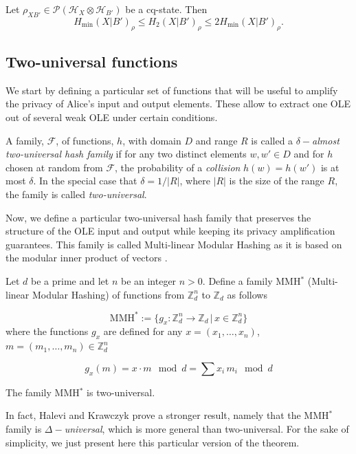 \begin{lemma}
Let $\rho_{X B'}\in\mathcal{P}(\mathcal{H}_X \otimes \mathcal{H}_{B'})$ be a cq-state. Then
$$H_{\min}(X|B')_{\rho} \leq H_2(X|B')_{\rho} \leq 2 H_{\min}(X|B')_{\rho}.$$
\end{lemma}



\subsection{Two-universal functions}

We start by defining a particular set of functions that will be useful to amplify the privacy of Alice's input and output elements. These allow to extract one OLE out of several weak OLE under certain conditions.


\begin{definition}
A family, $\mathcal{F}$, of functions, $h$, with domain $D$ and range $R$ is called a \textit{$\delta-$almost two-universal hash family} if for any two distinct elements $w,w'\in D$ and for $h$ chosen at random from $\mathcal{F}$, the probability of a \textit{collision} $h(w)=h(w')$ is at most $\delta$. In the special case that $\delta=1/|R|$, where $|R|$ is the size of the range $R$, the family is called \textit{two-universal}. 
\end{definition}

Now, we define a particular two-universal hash family that preserves the structure of the OLE input and output while keeping its privacy amplification guarantees. This family is called Multi-linear Modular Hashing as it is based on the modular inner product of vectors \cite{HK97}.
\begin{definition}
Let $d$ be a prime and let $n$ be an integer $n>0$. Define a family MMH$^*$ (Multi-linear Modular Hashing) of functions from $\mathbb{Z}_d^n$ to $\mathbb{Z}_d$ as follows

$$\text{MMH}^*:= \{ g_x : \mathbb{Z}_d^n\rightarrow \mathbb{Z}_d \, | \, x\in \mathbb{Z}_d^n \}$$
where the functions $g_x$ are defined for any $x = (x_1,\ldots,x_n)$, $m = (m_1,\ldots, m_n) \in \mathbb{Z}_d^n$

$$g_x(m) = x\cdot m \mod d = \sum x_i\, m_i \mod d$$
\label{def:MMH}
\end{definition}



\begin{theorem}
The family MMH$^*$ is two-universal.
\end{theorem}
In fact, Halevi and Krawczyk \cite{HK97} prove a stronger result, namely that the MMH$^*$ family is \textit{$\Delta-$universal}, which is more general than two-universal. For the sake of simplicity, we just present here this particular version of the theorem.

